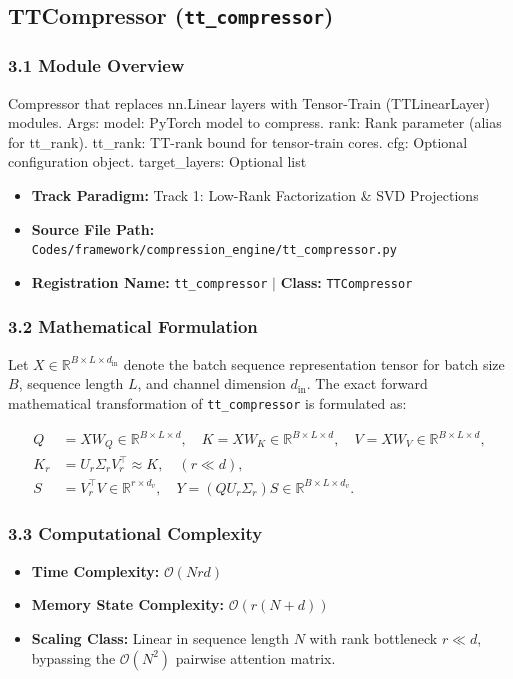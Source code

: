 \subsection{TTCompressor (\texttt{tt\_compressor})}
\label{sec:app_module_tt_compressor}

\subsubsection*{3.1 Module Overview}
Compressor that replaces nn.Linear layers with Tensor-Train (TTLinearLayer) modules.  Args:     model: PyTorch model to compress.     rank: Rank parameter (alias for tt\_rank).     tt\_rank: TT-rank bound for tensor-train cores.     cfg: Optional configuration object.     target\_layers: Optional list
\begin{itemize}
    \item \textbf{Track Paradigm:} Track 1: Low-Rank Factorization & SVD Projections
    \item \textbf{Source File Path:} \texttt{Codes/framework/compression\_engine/tt\_compressor.py}
    \item \textbf{Registration Name:} \texttt{tt\_compressor} $\mid$ \textbf{Class:} \texttt{TTCompressor}
\end{itemize}

\subsubsection*{3.2 Mathematical Formulation}
Let $X \in \mathbb{R}^{B \times L \times d_{\text{in}}}$ denote the batch sequence representation tensor for batch size $B$, sequence length $L$, and channel dimension $d_{\text{in}}$. The exact forward mathematical transformation of \texttt{tt\_compressor} is formulated as:

\begin{align}
Q &= X W_Q \in \mathbb{R}^{B \times L \times d}, \quad K = X W_K \in \mathbb{R}^{B \times L \times d}, \quad V = X W_V \in \mathbb{R}^{B \times L \times d}, \\
K_r &= U_r \Sigma_r V_r^\top \approx K, \quad (r \ll d), \\
S &= V_r^\top V \in \mathbb{R}^{r \times d_v}, \quad Y = (Q U_r \Sigma_r) S \in \mathbb{R}^{B \times L \times d_v}.
\end{align}


\subsubsection*{3.3 Computational Complexity}
\begin{itemize}
    \item \textbf{Time Complexity:} $\mathcal{O}(N r d)$
    \item \textbf{Memory State Complexity:} $\mathcal{O}(r(N + d))$
    \item \textbf{Scaling Class:} Linear in sequence length $N$ with rank bottleneck $r \ll d$, bypassing the $\mathcal{O}(N^2)$ pairwise attention matrix.
\end{itemize}

